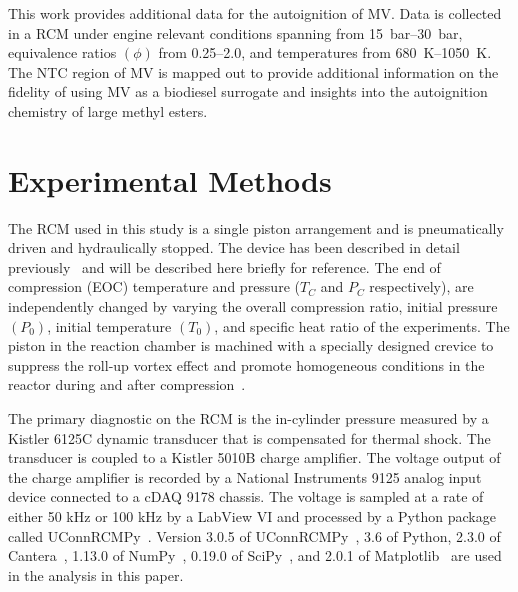 \documentclass[letterpaper, review, sort&compress]{elsarticle}
\begin{document}
This work provides additional data for the autoignition of MV. Data is collected in a RCM under
engine relevant conditions spanning from \SIrange{15}{30}{\bar}, equivalence ratios \((\phi)\) from
\numrange{0.25}{2.0}, and temperatures from \SIrange{680}{1050}{\K}. The NTC region of MV is mapped
out to provide additional information on the fidelity of using MV as a biodiesel surrogate and
insights into the autoignition chemistry of large methyl esters.

\section{Experimental Methods}\label{sec:experimental-methods}

The RCM used in this study is a single piston arrangement and is pneumatically driven and
hydraulically stopped. The device has been described in detail previously~\cite{Mittal2007a} and
will be described here briefly for reference. The end of compression (EOC) temperature and pressure
(\(T_C\) and \(P_C\) respectively), are independently changed by varying the overall compression
ratio, initial pressure \((P_0)\), initial temperature \((T_0)\), and specific heat ratio of the
experiments. The piston in the reaction chamber is machined with a specially designed crevice to
suppress the roll-up vortex effect and promote homogeneous conditions in the reactor during and
after compression~\cite{Mittal2006}.

The primary diagnostic on the RCM is the in-cylinder pressure measured by a Kistler 6125C dynamic
transducer that is compensated for thermal shock. The transducer is coupled to a Kistler 5010B
charge amplifier. The voltage output of the charge amplifier is recorded by a National Instruments
9125 analog input device connected to a cDAQ 9178 chassis. The voltage is sampled at a rate of
either 50 kHz or 100 kHz by a LabView VI and processed by a Python package called
UConnRCMPy~\cite{Weber2016a}. Version 3.0.5 of UConnRCMPy~\cite{uconnrcmpy}, 3.6 of Python, 2.3.0
of Cantera~\cite{cantera}, 1.13.0 of NumPy~\cite{vanderWalt2011}, 0.19.0 of SciPy~\cite{Jones2001},
and 2.0.1 of Matplotlib~\cite{Hunter2007} are used in the analysis in this paper.
\end{document}
